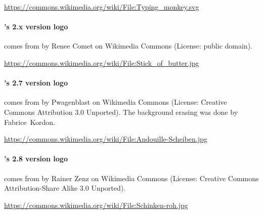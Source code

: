 \url{https://commons.wikimedia.org/wiki/File:Typing_monkey.svg}


\paragraph{\imitator{}'s 2.x version logo} comes from  by Renee Comet on Wikimedia Commons
	(License: public domain).

\url{https://commons.wikimedia.org/wiki/File:Stick_of_butter.jpg}

\paragraph{\imitator{}'s 2.7 version logo} comes from  by Pwagenblast on Wikimedia Commons
	(License: Creative Commons Attribution 3.0 Unported).
The background erasing was done by Fabrice~Kordon.

\url{https://commons.wikimedia.org/wiki/File:Andouille-Scheiben.jpg}


\paragraph{\imitator{}'s 2.8 version logo} comes from  by Rainer Zenz on Wikimedia Commons
	(License: Creative Commons Attribution-Share Alike 3.0 Unported).

\url{https://commons.wikimedia.org/wiki/File:Schinken-roh.jpg}


\newpage







